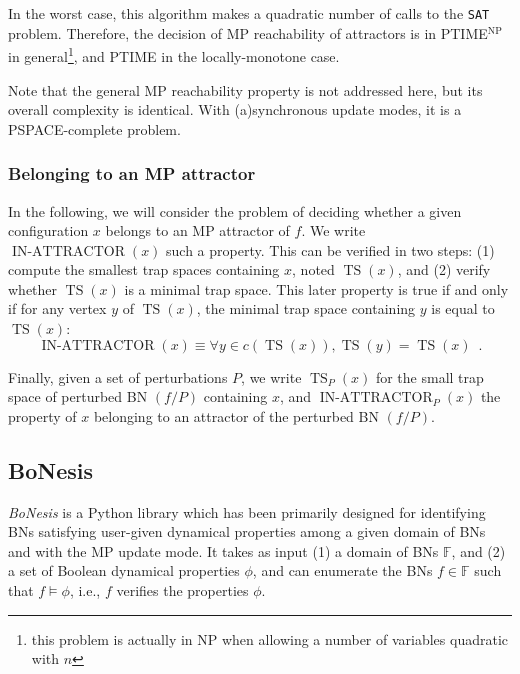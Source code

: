 \documentclass[PCJ,Unicode,screen,mode=plain]{cedram}
\begin{document}
In the worst case, this algorithm makes a quadratic number of calls to
the \texttt{SAT} problem. Therefore, the decision of MP reachability of
attractors is in PTIME\(^\text{NP}\) in general\footnote{this problem is
  actually in NP when allowing a number of variables quadratic with
  \(n\)}, and PTIME in the locally-monotone case.

Note that the general MP reachability property is not addressed here,
but its overall complexity is identical. With (a)synchronous update
modes, it is a PSPACE-complete problem.

\hypertarget{belonging-to-an-mp-attractor}{%
\subsubsection{Belonging to an MP
attractor}\label{belonging-to-an-mp-attractor}}

In the following, we will consider the problem of deciding whether a
given configuration \(x\) belongs to an MP attractor of \(f\). We write
\(\operatorname{IN-ATTRACTOR}(x)\) such a property. This can be verified
in two steps: (1) compute the smallest trap spaces containing \(x\),
noted \(\operatorname{TS}(x)\), and (2) verify whether
\(\operatorname{TS}(x)\) is a minimal trap space. This later property is
true if and only if for any vertex \(y\) of \(\operatorname{TS}(x)\),
the minimal trap space containing \(y\) is equal to
\(\operatorname{TS}(x)\): \[
\operatorname{IN-ATTRACTOR}(x) \equiv \forall y \in c(\operatorname{TS}(x)), \operatorname{TS}(y) = \operatorname{TS}(x) \enspace.
\]

Finally, given a set of perturbations \(P\), we write
\(\operatorname{TS}_P(x)\) for the small trap space of perturbed BN
\((f/P)\) containing \(x\), and \(\operatorname{IN-ATTRACTOR}_P(x)\) the
property of \(x\) belonging to an attractor of the perturbed BN
\((f/P)\).
\hypertarget{bonesis}{%
\subsection{BoNesis}\label{bonesis}}

\emph{BoNesis} is a Python library which has been primarily designed for identifying BNs satisfying
user-given dynamical properties among a given domain of BNs and with the MP update mode. It takes as
input (1) a domain of BNs
\(\mathbb F\), and (2) a set of Boolean dynamical properties \(\phi\),
and can enumerate the BNs \(f \in \mathbb F\) such that
\(f\models \phi\), i.e., \(f\) verifies the properties \(\phi\).
\end{document}
